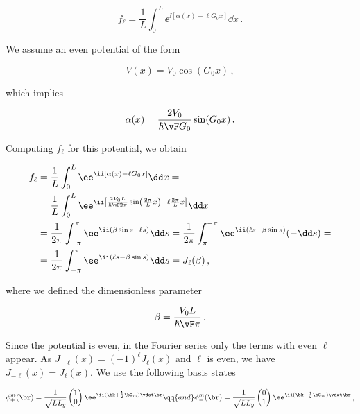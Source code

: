 \begin{equation}
    f_{\ell}=\frac{1}{L}\int_{0}^{L} \ee^{\ii[\alpha(x)-\ell G_{0}x]} \dd x\,.
\end{equation}

\noindent We assume an even potential of the form

\begin{equation}
    V(x)=V_{0}\cos(G_{0}x)\,,
\end{equation}

\noindent which implies

\begin{equation}
    \alpha(x)=\frac{2V_{0}}{\hbar \vF G_{0}}\sin(G_{0}x)\,.
\end{equation}

\noindent Computing $f_{\ell}$ for this potential, we obtain

\begin{equation}
\begin{aligned}
    f_{\ell} & =\frac{1}{L}\int_{0}^{L}\ee^{\ii[\alpha(x)-\ell G_{0}x]}\dd x=\\
             & =\frac{1}{L}\int_{0}^{L}\ee^{\ii\left[\frac{2V_{0}L}{\hbar \vF 2\pi} \sin\left(\frac{2\pi}{L} x\right) - \ell \frac{2\pi}{L} x \right]}\dd x=\\
             & =\frac{1}{2\pi}\int_{-\pi}^{\pi}\ee^{\ii(\beta\sin s-\ell s)}\dd s=\frac{1}{2\pi}\int_{\pi}^{-\pi}\ee^{\ii(\ell s-\beta\sin s)}(-\dd s)=\\
             & =\frac{1}{2\pi}\int_{-\pi}^{\pi}\ee^{\ii(\ell s-\beta\sin s)}\dd s=J_{\ell}(\beta)\,,
\end{aligned}
\end{equation}

\noindent where we defined the dimensionless parameter

\begin{equation}
    \label{eq:beta_definition}
    \beta=\frac{V_{0}L}{\hbar \vF \pi}\,.
\end{equation}

Since the potential is even, in the Fourier series only the terms with even $\ell$ appear.
As $J_{-\ell}(x)=(-1)^{\ell}J_{\ell}(x)$ and $\ell$ is even, we have $J_{-\ell}(x)=J_{\ell}(x)$.
We use the following basis states

\begin{equation}
    \phi_{+}^{m} (\br) =\frac{1}{\sqrt{L L_y}} \begin{pmatrix}1\\0\end{pmatrix}
    \ee^{\ii(\bk + \frac{1}{2} \bG_m)\vdot\br} \qq{and}
    \phi_{-}^{m} (\br) =\frac{1}{\sqrt{L L_y}} \begin{pmatrix}0\\1\end{pmatrix}
    \ee^{\ii(\bk - \frac{1}{2} \bG_m)\vdot\br}\,,
\end{equation}

